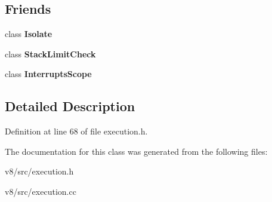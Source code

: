 \subsection*{Friends}
\begin{DoxyCompactItemize}
\item 
\mbox{\label{classv8_1_1internal_1_1StackGuard_aba4f0964bdacf2bbf62cf876e5d28d0a}} 
class {\bfseries Isolate}
\item 
\mbox{\label{classv8_1_1internal_1_1StackGuard_ad886bb634836d54ec18f36a04e2a4a3c}} 
class {\bfseries Stack\+Limit\+Check}
\item 
\mbox{\label{classv8_1_1internal_1_1StackGuard_ab6a9f22bbd76a6d0783be0f113b96afc}} 
class {\bfseries Interrupts\+Scope}
\end{DoxyCompactItemize}


\subsection{Detailed Description}


Definition at line 68 of file execution.\+h.



The documentation for this class was generated from the following files\+:\begin{DoxyCompactItemize}
\item 
v8/src/execution.\+h\item 
v8/src/execution.\+cc\end{DoxyCompactItemize}
